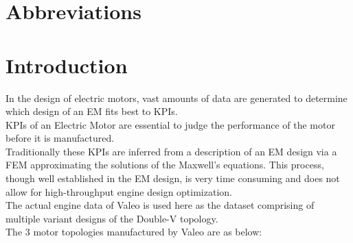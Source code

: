 \documentclass{report} %
\begin{document}
\newpage

\newpage

\chapter*{Abbreviations}
\begin{acronym}[TDMA]
  

\end{acronym}

\newpage

\newpage

\chapter*{Introduction} 
In the design of electric motors, vast amounts of data are generated to determine which design of an EM fits best to KPIs. \\
KPIs of an Electric Motor are essential to judge the performance of the motor before it is manufactured. \\
Traditionally these KPIs are inferred from a description of an EM design via a FEM approximating the solutions of the Maxwell’s equations. This process, though well established in the EM design, is very time consuming and does not allow for high-throughput engine design optimization. \\
The actual engine data of Valeo is used here as the dataset comprising of multiple variant designs of the Double-V topology.\\
The 3 motor topologies manufactured by Valeo are as below:
\end{document}
